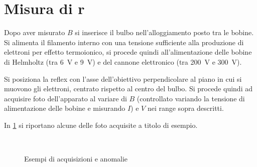 \section{Misura di \textbf{r}}

Dopo aver misurato $B$ si inserisce il bulbo nell'alloggiamento posto tra le bobine.
Si alimenta il filamento interno con una tensione sufficiente alla produzione di elettroni per effetto termoionico, si procede quindi all'alimentazione delle bobine di Helmholtz (tra \SI{6}{\volt} e \SI{9}{\volt}) e del cannone elettronico (tra \SI{200}{\volt} e \SI{300}{\volt}).


Si posiziona la reflex con l'asse dell'obiettivo perpendicolare al piano in cui si muovono gli elettroni, centrato rispetto al centro del bulbo.
Si procede quindi ad acquisire foto dell'apparato al variare di $B$ (controllato variando la tensione di alimentazione delle bobine e misurando $I$) e $V$ nei range sopra descritti.

In \figurename{ \ref{f:acquisizione}} si riportano alcune delle foto acquisite a titolo di esempio.

		\begin{figure}[H]
		\centering
		\\
		\caption{Esempi di acquisizioni e anomalie}
		\label{f:acquisizione}
	\end{figure}

